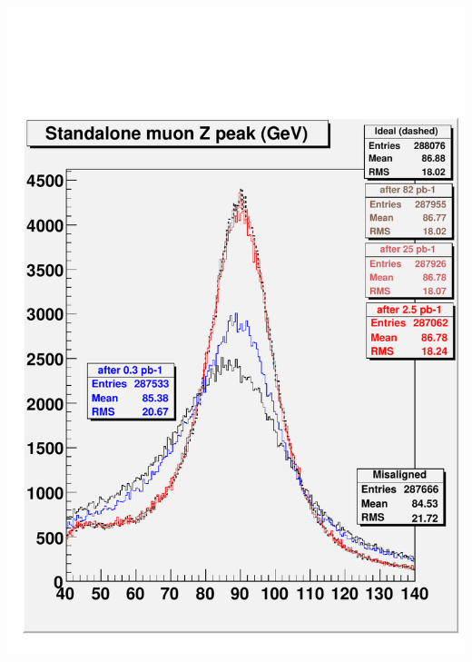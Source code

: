 \documentclass[compress]{beamer}
\begin{document}
\begin{frame}
\begin{center}
\begin{minipage}{0.8\linewidth}
\begin{columns}
\includegraphics[width=\linewidth]{checkit_standaloneZ.pdf}

\end{columns}
\end{minipage}
\end{center}
\end{frame}
\end{document}
